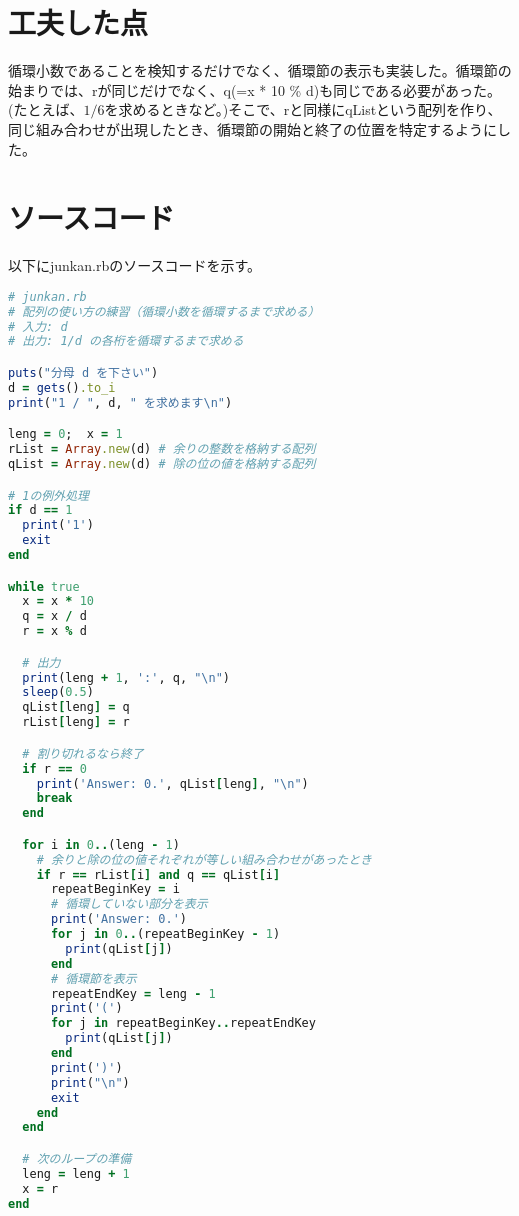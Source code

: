 \documentclass{jsarticle}
\begin{document}
\section{工夫した点}

循環小数であることを検知するだけでなく、循環節の表示も実装した。循環節の始まりでは、rが同じだけでなく、q(=x * 10 \% d)も同じである必要があった。(たとえば、$1/6$を求めるときなど。)そこで、rと同様にqListという配列を作り、同じ組み合わせが出現したとき、循環節の開始と終了の位置を特定するようにした。

\section{ソースコード}

以下にjunkan.rbのソースコードを示す。

\begin{lstlisting}[language=ruby]
# junkan.rb
# 配列の使い方の練習（循環小数を循環するまで求める）
# 入力: d
# 出力: 1/d の各桁を循環するまで求める

puts("分母 d を下さい")
d = gets().to_i
print("1 / ", d, " を求めます\n")

leng = 0;  x = 1
rList = Array.new(d) # 余りの整数を格納する配列
qList = Array.new(d) # 除の位の値を格納する配列

# 1の例外処理
if d == 1
  print('1')
  exit
end

while true
  x = x * 10
  q = x / d
  r = x % d

  # 出力
  print(leng + 1, ':', q, "\n")
  sleep(0.5)
  qList[leng] = q
  rList[leng] = r

  # 割り切れるなら終了
  if r == 0
    print('Answer: 0.', qList[leng], "\n")
    break
  end

  for i in 0..(leng - 1)
    # 余りと除の位の値それぞれが等しい組み合わせがあったとき
    if r == rList[i] and q == qList[i]
      repeatBeginKey = i
      # 循環していない部分を表示
      print('Answer: 0.')
      for j in 0..(repeatBeginKey - 1)
        print(qList[j])
      end
      # 循環節を表示
      repeatEndKey = leng - 1
      print('(')
      for j in repeatBeginKey..repeatEndKey
        print(qList[j])
      end
      print(')')
      print("\n")
      exit
    end
  end

  # 次のループの準備
  leng = leng + 1
  x = r
end
\end{lstlisting}
\end{document}
